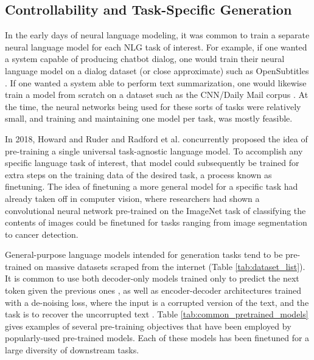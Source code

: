 \begin{itemize}
\section{Controllability and Task-Specific Generation}

In the early days of neural language modeling, it was common to train a separate neural language model for each NLG task of interest.
For example, if one wanted a system capable of producing chatbot dialog, one would train their neural language model on a dialog dataset (or close approximate) such as OpenSubtitles \citep{vinyals2015neural}.
If one wanted a system able to perform text summarization, one would likewise train a model from scratch on a dataset such as the CNN/Daily Mail corpus \cite{nallapati2016abstractive,DBLP:journals/corr/SeeLM17}.
At the time, the neural networks being used for these sorts of tasks were relatively small, and training and maintaining one model per task, was mostly feasible.

In 2018, Howard and Ruder \citep{howard2018universal} and Radford et al. \citep{radford2018improving} concurrently proposed the idea of pre-training a single universal task-agnostic language model.
To accomplish any specific language task of interest, that model could subsequently be trained for extra steps on the training data of the desired task, a process known as finetuning.
The idea of finetuning a more general model for a specific task had already taken off in computer vision, where researchers had shown a convolutional neural network pre-trained on the ImageNet task of classifying the contents of images could be finetuned for tasks ranging from image segmentation to cancer detection.

General-purpose language models intended for generation tasks tend to be pre-trained on massive datasets scraped from the internet (Table \ref{tab:dataset_list}).
It is common to use both decoder-only models trained only to predict the next token given the previous ones \citep{radford2019language}, as well as encoder-decoder architectures trained with a de-noising loss, where the input is a corrupted version of the text, and the task is to recover the uncorrupted text \citep{raffel2019exploring,lewis2020bart}.
Table \ref{tab:common_pretrained_models} gives examples of several pre-training objectives that have been employed by popularly-used pre-trained models.
Each of these models has been finetuned for a large diversity of downstream tasks.


\end{itemize}
